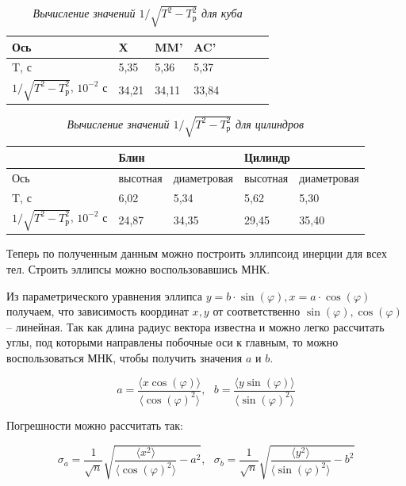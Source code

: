 \documentclass[a4paper, 12pt]{article}
\begin{document}
\begin{table}[!ht]
    \centering
    \begin{tabular}{|l|l|l|l|l|l|l|l|}
    \hline
        Ось & X & MM’ & AC’ \\ \hline
        T, с & 5,35 & 5,36 & 5,37 \\ \hline
        $1 / \sqrt{T^2 - T^2_\text{р}}$, $10^{-2} \text{ с}$ & 34,21 & 34,11 & 33,84 \\ \hline
    \end{tabular}\caption{\textit{Вычисление значений $1 / \sqrt{T^2 - T^2_\text{р}}$ для куба}}
\end{table}

\begin{table}[!ht]
    \centering
    \begin{tabular}{|l|l|l|l|l|}
    \hline
        ~ & \multicolumn{2}{l|}{Блин} & \multicolumn{2}{l|}{Цилиндр} \\ \hline
        Ось & высотная & диаметровая & высотная & диаметровая \\ \hline
        T, с & 6,02 & 5,34 & 5,62 & 5,30 \\ \hline
        $1 / \sqrt{T^2 - T^2_\text{р}}$, $10^{-2} \text{ с}$ & 24,87 & 34,35 & 29,45 & 35,40 \\ \hline
    \end{tabular}\caption{\textit{Вычисление значений $1 / \sqrt{T^2 - T^2_\text{р}}$ для цилиндров}}
\end{table}

Теперь по полученным данным можно построить эллипсоид инерции для всех тел. Строить эллипсы можно воспользовавшись МНК.

Из параметрического уравнения эллипса $y = b \cdot \sin(\varphi), x = a \cdot \cos(\varphi)$ получаем, что зависимость координат $x, y$ от соответственно $\sin(\varphi), \cos(\varphi)$ -- линейная. Так как длина радиус вектора известна и можно легко рассчитать углы, под которыми направлены побочные оси к главным, то можно воспользоваться МНК, чтобы получить значения $a$ и $b$.

\begin{equation}
    a = \frac{\langle x \cos(\varphi) \rangle}{\langle \cos(\varphi) ^ 2 \rangle}, \ \ \ b = \frac{\langle y \sin(\varphi) \rangle}{\langle \sin(\varphi) ^ 2 \rangle}
\end{equation}

Погрешности можно рассчитать так:

\begin{equation}
    \sigma_{a} = \frac{1}{\sqrt{n}}\sqrt{\frac{\langle x^2 \rangle}{\langle \cos(\varphi)^2 \rangle} - a^2}, \ \ \ \sigma_{b} = \frac{1}{\sqrt{n}}\sqrt{\frac{\langle y^2 \rangle}{\langle \sin(\varphi)^2 \rangle} - b^2}
\end{equation}
\end{document}
